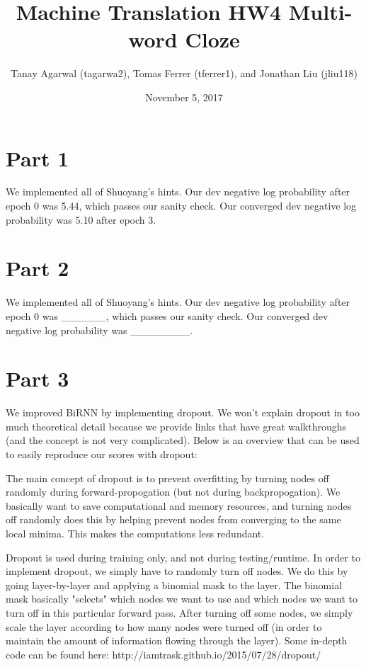 \documentclass{article}
\title{Machine Translation HW4 Multi-word Cloze}
\author{Tanay Agarwal (tagarwa2), Tomas Ferrer (tferrer1), and Jonathan Liu (jliu118)}
\date{November 5, 2017}
\begin{document}
\maketitle


\section{Part 1}

We implemented all of Shuoyang's hints. Our dev negative log probability after epoch 0 was 5.44, which passes our sanity check. Our converged dev negative log probability was 5.10 after epoch 3.

\section{Part 2}

We implemented all of Shuoyang's hints. Our dev negative log probability after epoch 0 was ______, which passes our sanity check. Our converged dev negative log probability was ________.

\section{Part 3}

We improved BiRNN by implementing dropout. We won't explain dropout in too much theoretical detail because we provide links that have great walkthroughs (and the concept is not very complicated). Below is an overview that can be used to easily reproduce our scores with dropout:

The main concept of dropout is to prevent overfitting by turning nodes off randomly during forward-propogation (but not during backpropogation). We basically want to save computational and memory resources, and turning nodes off randomly does this by helping prevent nodes from converging to the same local minima. This makes the computations less redundant.

Dropout is used during training only, and not during testing/runtime. In order to implement dropout, we simply have to randomly turn off nodes. We do this by going layer-by-layer and applying a binomial mask to the layer. The binomial mask basically "selects" which nodes we want to use and which nodes we want to turn off in this particular forward pass. After turning off some nodes, we simply scale the layer according to how many nodes were turned off (in order to maintain the amount of information flowing through the layer). Some in-depth code can be found here: http://iamtrask.github.io/2015/07/28/dropout/
\end{document}
